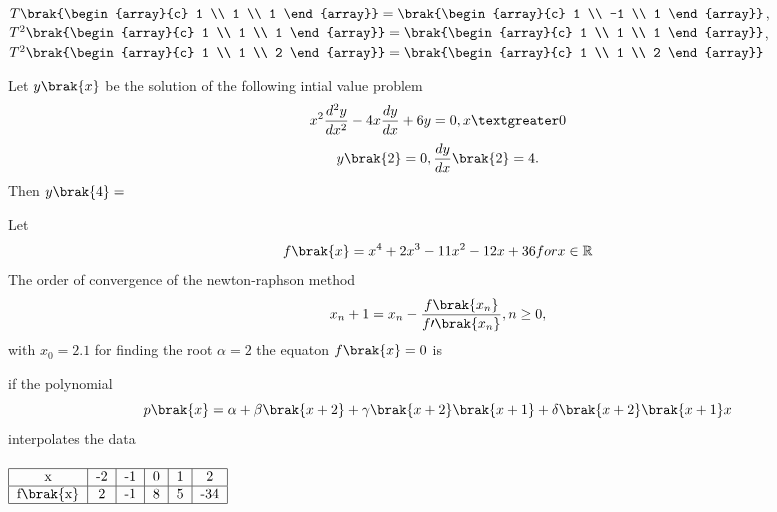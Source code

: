 $T\brak{\begin{array}{c}
1 \\
1 \\
1
\end{array}}=\brak{\begin{array}{c}
1 \\
-1 \\
1
\end{array}}$, $T^2\brak{\begin{array}{c}
1 \\
1 \\
1
\end{array}}=\brak{\begin{array}{c}
1 \\
1 \\
1
\end{array}}$,$T^2\brak{\begin{array}{c}
1 \\
1 \\
2
\end{array}}=\brak{\begin{array}{c}
1 \\
1 \\
2
\end{array}}$
\item Let $y\brak{x}$ be the solution of the following intial value problem 
\begin{equation}
    x^2{\frac{d^2{y}}{d{x}^2}}-4x\frac{dy}{dx}+6y=0,    x\textgreater 0\end{equation}
    \begin{equation}
    y\brak{2}=0,\frac{dy}{dx}\brak{2}=4.
\end{equation}
Then $y\brak{4}=$
\item Let 
\begin{equation}
    f\brak{x}=x^4+2x^3-11x^2-12x+36 for x\in \mathbb{R}
\end{equation}
The order of convergence of the newton-raphson method
\begin{equation}
    x_n+1=x_n-\frac{f\brak{x_n}}{f \prime \brak{x_n}} , n\geq 0,
\end{equation}
with $x_0=2.1$ for finding the root $\alpha =2$ the equaton $f\brak{x}=0$ is 
\item if the polynomial 
\begin{equation}
    p\brak{x}=\alpha + \beta \brak{x+2}+\gamma \brak{x+2}\brak{x+1}+\delta \brak{x+2}\brak{x+1}x
\end{equation}
interpolates the data\\ \\$\begin{tabular}{|c|c|c|c|c|c|}

\hline
x    & -2   & -1   & 0   & 1   & 2   \\
\hline
f\brak{x}    & 2   & -1   & 8   & 5   & -34  \\
\hline
\end{tabular}$\\\\
